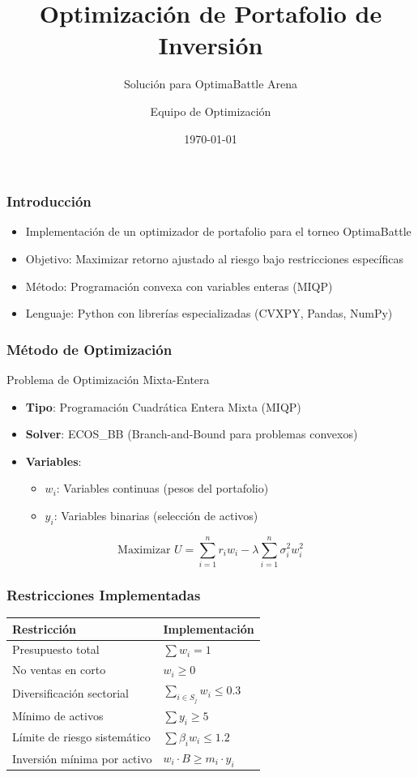 \documentclass{beamer}
\title{Optimización de Portafolio de Inversión}
\subtitle{Solución para OptimaBattle Arena}
\author{Equipo de Optimización}
\date{\today}
\begin{document}
\frame{\titlepage}

\begin{frame}
\frametitle{Introducción}
\begin{itemize}
\item Implementación de un optimizador de portafolio para el torneo OptimaBattle
\item Objetivo: Maximizar retorno ajustado al riesgo bajo restricciones específicas
\item Método: Programación convexa con variables enteras (MIQP)
\item Lenguaje: Python con librerías especializadas (CVXPY, Pandas, NumPy)
\end{itemize}
\end{frame}

\begin{frame}
\frametitle{Método de Optimización}
\begin{block}{Problema de Optimización Mixta-Entera}
\begin{itemize}
\item \textbf{Tipo}: Programación Cuadrática Entera Mixta (MIQP)
\item \textbf{Solver}: ECOS\_BB (Branch-and-Bound para problemas convexos)
\item \textbf{Variables}:
\begin{itemize}
\item $w_i$: Variables continuas (pesos del portafolio)
\item $y_i$: Variables binarias (selección de activos)
\end{itemize}
\end{itemize}
\end{block}

\begin{equation*}
\text{Maximizar } U = \sum_{i=1}^n r_i w_i - \lambda \sum_{i=1}^n \sigma_i^2 w_i^2
\end{equation*}
\end{frame}

\begin{frame}
\frametitle{Restricciones Implementadas}
\begin{table}[]
\small
\begin{tabular}{ll}
\toprule
\textbf{Restricción} & \textbf{Implementación} \\
\midrule
Presupuesto total & $\sum w_i = 1$ \\
No ventas en corto & $w_i \geq 0$ \\
Diversificación sectorial & $\sum_{i \in S_j} w_i \leq 0.3$ \\
Mínimo de activos & $\sum y_i \geq 5$ \\
Límite de riesgo sistemático & $\sum \beta_i w_i \leq 1.2$ \\
Inversión mínima por activo & $w_i \cdot B \geq m_i \cdot y_i$ \\
\bottomrule
\end{tabular}
\end{table}
\end{frame}
\end{document}
